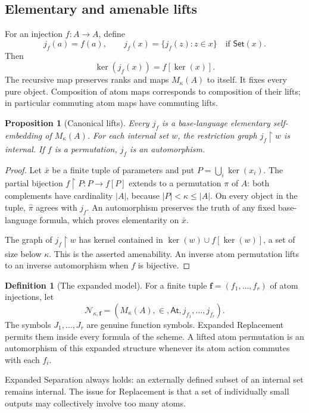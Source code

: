 \documentclass[11pt,letterpaper]{article}
\numberwithin{equation}{section}
\theoremstyle{plain}
\newtheorem{proposition}[proposition]{Proposition}
\theoremstyle{definition}
\newtheorem{definition}[definition]{Definition}
\theoremstyle{remark}
\newcommand{\At}{\mathsf{At}}
\newcommand{\Set}{\mathsf{Set}}
\newcommand{\kerat}{\operatorname{ker}}
\newcommand{\Mk}{M_\kappa(A)}
\begin{document}
\subsection{Elementary and amenable lifts}

For an injection $f:A\to A$, define
\[
j_f(a)=f(a),\qquad
j_f(x)=\{j_f(z):z\in x\}\quad\text{if }\Set(x).
\]
Then
\begin{equation}\label{nee:ca:eq:lift-kernel}
\kerat(j_f(x))=f[\kerat(x)].
\end{equation}
The recursive map preserves ranks and maps $\Mk$ to itself. It fixes every pure object. Composition of atom maps corresponds to composition of their lifts; in particular commuting atom maps have commuting lifts.

\begin{proposition}[Canonical lifts]\label{nee:ca:prop:lifts}
Every $j_f$ is a base-language elementary self-embedding of $\Mk$. For each internal set $w$, the restriction graph $j_f\mathbin{\upharpoonright}w$ is internal. If $f$ is a permutation, $j_f$ is an automorphism.
\end{proposition}
\begin{proof}
Let $\bar x$ be a finite tuple of parameters and put $P=\bigcup_i\kerat(x_i)$. The partial bijection $f\mathbin{\upharpoonright}P:P\to f[P]$ extends to a permutation $\pi$ of $A$: both complements have cardinality $|A|$, because $|P|<\kappa\leq|A|$. On every object in the tuple, $\widehat\pi$ agrees with $j_f$. An automorphism preserves the truth of any fixed base-language formula, which proves elementarity on $\bar x$.

The graph of $j_f\mathbin{\upharpoonright}w$ has kernel contained in
$\kerat(w)\cup f[\kerat(w)]$, a set of size below $\kappa$. This is the asserted amenability. An inverse atom permutation lifts to an inverse automorphism when $f$ is bijective.
\end{proof}

\begin{definition}[The expanded model]
For a finite tuple $\boldsymbol f=(f_1,\ldots,f_r)$ of atom injections, let
\[
\mathcal N_{\kappa,\boldsymbol f}
=(\Mk,\in,\At,j_{f_1},\ldots,j_{f_r}).
\]
The symbols $J_1,\ldots,J_r$ are genuine function symbols. Expanded Replacement permits them inside every formula of the scheme. A lifted atom permutation is an automorphism of this expanded structure whenever its atom action commutes with each $f_i$.
\end{definition}

Expanded Separation always holds: an externally defined subset of an internal set remains internal. The issue for Replacement is that a set of individually small outputs may collectively involve too many atoms.
\end{document}
